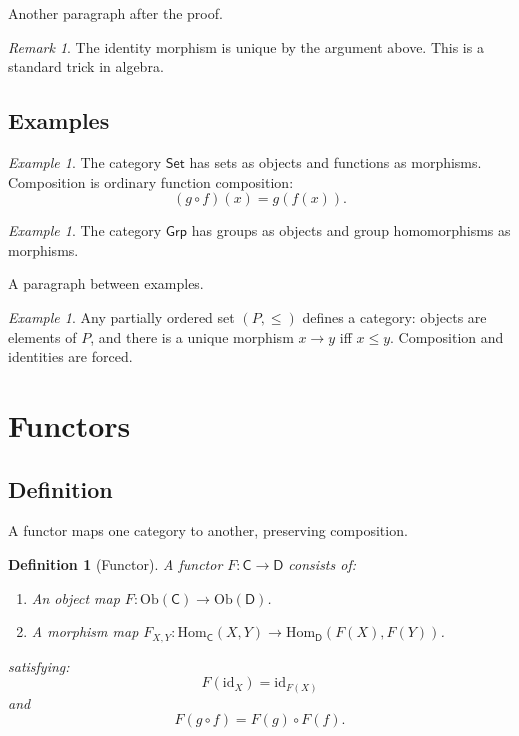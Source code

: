\documentclass[a4paper]{article}
\newtheorem{definition}[theorem]{Definition}
\theoremstyle{remark}
\newtheorem{remark}[theorem]{Remark}
\newtheorem{example}[theorem]{Example}
\begin{document}
Another paragraph after the proof.

\begin{remark}
The identity morphism is unique by the argument above.
This is a standard trick in algebra.
\end{remark}

\subsection{Examples}

\begin{example}
The category $\mathsf{Set}$ has sets as objects and functions
as morphisms.  Composition is ordinary function composition:
\begin{equation}
  (g \circ f)(x) = g(f(x)).
\end{equation}
\end{example}

\begin{example}
The category $\mathsf{Grp}$ has groups as objects and group
homomorphisms as morphisms.
\end{example}

A paragraph between examples.

\begin{example}
Any partially ordered set $(P, \leq)$ defines a category:
objects are elements of $P$, and there is a unique morphism
$x \to y$ iff $x \leq y$.  Composition and identities are forced.
\end{example}

\section{Functors}

\subsection{Definition}

A functor maps one category to another, preserving composition.

\begin{definition}[Functor]
A \emph{functor} $F \colon \mathsf{C} \to \mathsf{D}$ consists of:
\begin{enumerate}
  \item An object map $F \colon \mathrm{Ob}(\mathsf{C})
    \to \mathrm{Ob}(\mathsf{D})$.
  \item A morphism map $F_{X,Y} \colon \mathrm{Hom}_{\mathsf{C}}(X, Y)
    \to \mathrm{Hom}_{\mathsf{D}}(F(X), F(Y))$.
\end{enumerate}
satisfying:
\begin{equation}
  F(\mathrm{id}_X) = \mathrm{id}_{F(X)}
\end{equation}
and
\begin{equation}
  F(g \circ f) = F(g) \circ F(f).
\end{equation}
\end{definition}
\end{document}
